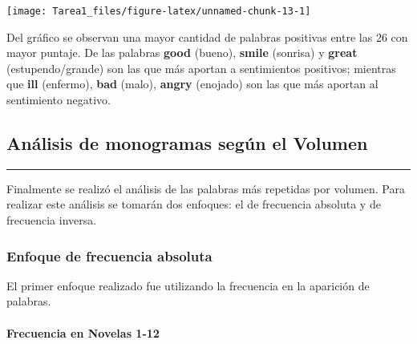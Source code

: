 \documentclass[
]{article}
\begin{document}
\texttt{[image: Tarea1\_files/figure-latex/unnamed-chunk-13-1]}

Del gráfico se observan una mayor cantidad de palabras positivas entre
las 26 con mayor puntaje. De las palabras \textbf{good} (bueno),
\textbf{smile} (sonrisa) y \textbf{great} (estupendo/grande) son las que
más aportan a sentimientos positivos; mientras que \textbf{ill}
(enfermo), \textbf{bad} (malo), \textbf{angry} (enojado) son las que más
aportan al sentimiento negativo.

\hypertarget{anuxe1lisis-de-monogramas-seguxfan-el-volumen}{%
\subsection{\texorpdfstring{\textbf{Análisis de monogramas según el
Volumen}}{Análisis de monogramas según el Volumen}}\label{anuxe1lisis-de-monogramas-seguxfan-el-volumen}}

\begin{center}\rule{0.5\linewidth}{0.5pt}\end{center}

Finalmente se realizó el análisis de las palabras más repetidas por
volumen. Para realizar este análisis se tomarán dos enfoques: el de
frecuencia absoluta y de frecuencia inversa.

\hypertarget{enfoque-de-frecuencia-absoluta}{%
\subsubsection{\texorpdfstring{\textbf{Enfoque de frecuencia
absoluta}}{Enfoque de frecuencia absoluta}}\label{enfoque-de-frecuencia-absoluta}}

El primer enfoque realizado fue utilizando la frecuencia en la aparición
de palabras.

\hypertarget{frecuencia-en-novelas-1-12}{%
\paragraph{\texorpdfstring{\textbf{Frecuencia en Novelas
1-12}}{Frecuencia en Novelas 1-12}}\label{frecuencia-en-novelas-1-12}}
\end{document}
